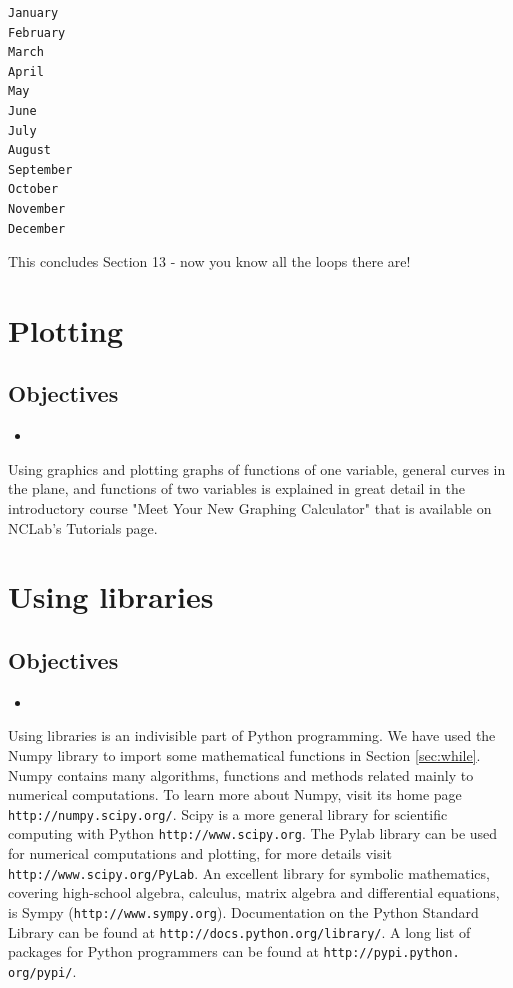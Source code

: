 \documentclass[article,A4,12pt]{llncs}
\begin{document}
\begin{verbatim}
January
February
March
April
May
June
July
August
September
October
November
December
\end{verbatim}
This concludes Section 13 - now you know all the loops there are!

\section{Plotting}

\subsection{Objectives}

\begin{itemize}
\item
\end{itemize}

Using graphics and plotting graphs of functions of one variable, 
general curves in the plane, and functions of two variables is 
explained in great detail in the introductory course "Meet Your 
New Graphing Calculator" that is available on NCLab's Tutorials page.

\section{Using libraries}\label{subsec:importinglib}

\subsection{Objectives}

\begin{itemize}
\item
\end{itemize}

Using libraries is an indivisible part of Python programming. We have 
used the Numpy library to import some mathematical functions in Section 
\ref{sec:while}. Numpy contains many algorithms, functions and methods 
related mainly to numerical computations. To learn more about Numpy,
visit its home page {\tt http://numpy.scipy.org/}. Scipy is a more 
general library for scientific computing with Python {\tt http://www.scipy.org}.
The Pylab library can be used for numerical computations and plotting,
for more details visit {\tt http://www.scipy.org/PyLab}. An excellent 
library for symbolic mathematics, covering high-school algebra, calculus,
matrix algebra and differential equations, is Sympy ({\tt http://www.sympy.org}).
Documentation on the Python Standard Library can be found at 
{\tt http://docs.python.org/library/}. A long list of packages for Python 
programmers can be found at {\tt http://pypi.python. org/pypi/}.
\end{document}
